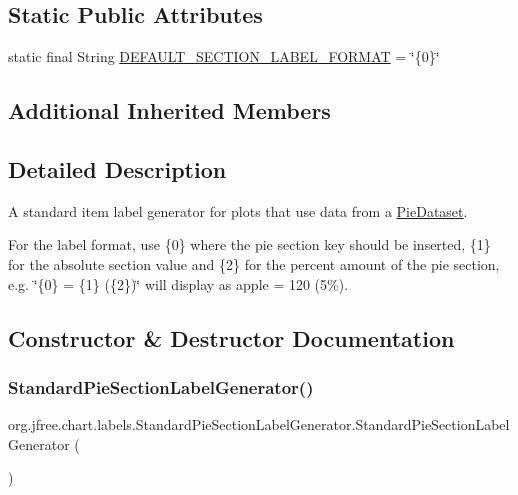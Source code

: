 \subsection*{Static Public Attributes}
\begin{DoxyCompactItemize}
\item 
static final String \mbox{\hyperlink{classorg_1_1jfree_1_1chart_1_1labels_1_1_standard_pie_section_label_generator_a65aeb0d419f1f1edd0fa43dd13b902b6}{D\+E\+F\+A\+U\+L\+T\+\_\+\+S\+E\+C\+T\+I\+O\+N\+\_\+\+L\+A\+B\+E\+L\+\_\+\+F\+O\+R\+M\+AT}} = \char`\"{}\{0\}\char`\"{}
\end{DoxyCompactItemize}
\subsection*{Additional Inherited Members}


\subsection{Detailed Description}
A standard item label generator for plots that use data from a \mbox{\hyperlink{}{Pie\+Dataset}}. 

For the label format, use \{0\} where the pie section key should be inserted, \{1\} for the absolute section value and \{2\} for the percent amount of the pie section, e.\+g. {\ttfamily \char`\"{}\{0\} = \{1\} (\{2\})\char`\"{}} will display as {\ttfamily apple = 120 (5\%)}. 

\subsection{Constructor \& Destructor Documentation}
\mbox{\label{classorg_1_1jfree_1_1chart_1_1labels_1_1_standard_pie_section_label_generator_a396c181748014a114419deaa22ebde92}} 
\subsubsection{\texorpdfstring{Standard\+Pie\+Section\+Label\+Generator()}{StandardPieSectionLabelGenerator()}\hspace{0.1cm}{\footnotesize\ttfamily [1/5]}}
{\footnotesize\ttfamily org.\+jfree.\+chart.\+labels.\+Standard\+Pie\+Section\+Label\+Generator.\+Standard\+Pie\+Section\+Label\+Generator (\begin{DoxyParamCaption}{ }\end{DoxyParamCaption})}


